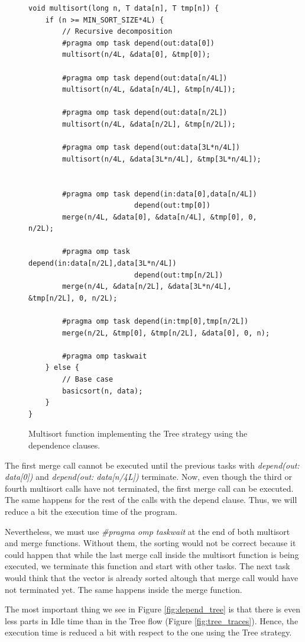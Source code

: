 \documentclass[12pt, a4paper]{article}
\begin{document}
\begin{figure}[H]
\begin{lstlisting}
void multisort(long n, T data[n], T tmp[n]) {
    if (n >= MIN_SORT_SIZE*4L) {
        // Recursive decomposition
		#pragma omp task depend(out:data[0])
		multisort(n/4L, &data[0], &tmp[0]);
		
		#pragma omp task depend(out:data[n/4L])
		multisort(n/4L, &data[n/4L], &tmp[n/4L]);
		
		#pragma omp task depend(out:data[n/2L])
		multisort(n/4L, &data[n/2L], &tmp[n/2L]);
		
		#pragma omp task depend(out:data[3L*n/4L])
		multisort(n/4L, &data[3L*n/4L], &tmp[3L*n/4L]);

		
		#pragma omp task depend(in:data[0],data[n/4L]) 
						 depend(out:tmp[0])
		merge(n/4L, &data[0], &data[n/4L], &tmp[0], 0, n/2L);
		
		#pragma omp task depend(in:data[n/2L],data[3L*n/4L])
						 depend(out:tmp[n/2L])
		merge(n/4L, &data[n/2L], &data[3L*n/4L], &tmp[n/2L], 0, n/2L);
		
		#pragma omp task depend(in:tmp[0],tmp[n/2L])
        merge(n/2L, &tmp[0], &tmp[n/2L], &data[0], 0, n);
        
        #pragma omp taskwait
	} else {
		// Base case
		basicsort(n, data);
	}
}
\end{lstlisting}

\caption{Multisort function implementing the Tree strategy using the dependence clauses.}
\end{figure}

The first merge call cannot be executed until the previous tasks with \textit{depend(out: data[0])} and \textit{depend(out: data[n/4L])} terminate. Now, even though the third or fourth multisort calls have not terminated, the first merge call can be executed. The same happens for the rest of the calls with the depend clause. Thus, we will reduce a bit the execution time of the program.

Nevertheless, we must use \textit{\#pragma omp taskwait} at the end of both multisort and merge functions. Without them, the sorting would not be correct because it could happen that while the last merge call inside the multisort function is being executed, we terminate this function and start with other tasks. The next task would think that the vector is already sorted altough that merge call would have not terminated yet. The same happens inside the merge function.

The most important thing we see in Figure \ref{fig:depend_tree} is that there is even less parts in Idle time than in the Tree flow (Figure \ref{fig:tree_traces}). Hence, the execution time is reduced a bit with respect to the one using the Tree strategy.
\end{document}
